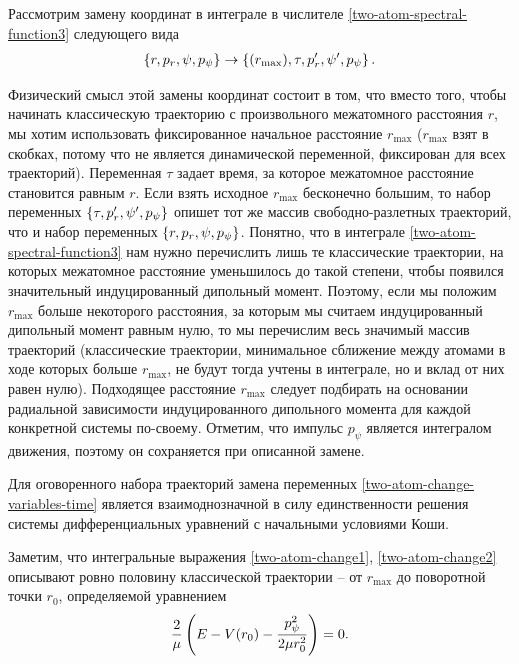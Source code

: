 Рассмотрим замену координат в интеграле в числителе \eqref{two-atom-spectral-function3} следующего вида
\begin{gather}
    \left\{ r, p_r, \psi, p_\psi \right\} \rightarrow \left\{ (r_\text{max}), \tau, p_r^\prime, \psi^\prime, p_\psi \right\} \label{two-atom-change-variables-time}.
\end{gather}

Физический смысл этой замены координат состоит в том, что вместо того, чтобы начинать классическую траекторию с произвольного межатомного расстояния $r$, мы хотим использовать фиксированное начальное расстояние $r_\text{max}$ ($r_\text{max}$ взят в скобках, потому что не является динамической переменной, фиксирован для всех траекторий). Переменная $\tau$ задает время, за которое межатомное расстояние становится равным $r$. Если взять исходное $r_\text{max}$ бесконечно большим, то набор переменных $\left\{ \tau, p_r^\prime, \psi^\prime, p_\psi \right\}$ опишет тот же массив свободно-разлетных траекторий, что и набор переменных $\left\{ r, p_r, \psi, p_\psi \right\}$. Понятно, что в интеграле \eqref{two-atom-spectral-function3} нам нужно перечислить лишь те классические траектории, на которых межатомное расстояние уменьшилось до такой степени, чтобы появился значительный индуцированный дипольный момент. Поэтому, если мы положим $r_\text{max}$ больше некоторого расстояния, за которым мы считаем индуцированный дипольный момент равным нулю, то мы перечислим весь значимый массив траекторий (классические траектории, минимальное сближение между атомами в ходе которых больше $r_\text{max}$, не будут тогда учтены в интеграле, но и вклад от них равен нулю). Подходящее расстояние $r_\text{max}$ следует подбирать на основании радиальной зависимости индуцированного дипольного момента для каждой конкретной системы по-своему. Отметим, что импульс $p_\psi$ является интегралом движения, поэтому он сохраняется при описанной замене. \par
Для оговоренного набора траекторий замена переменных \eqref{two-atom-change-variables-time} является взаимоднозначной в силу единственности решения системы дифференциальных уравнений с начальными условиями Коши. \par
Заметим, что интегральные выражения \eqref{two-atom-change1}, \eqref{two-atom-change2} описывают ровно половину классической траектории -- от $r_\text{max}$ до поворотной точки $r_0$, определяемой уравнением
\begin{gather}
    \frac{2}{\mu} \left( E - V(r_0) - \frac{p_\psi^2}{2 \mu r_0^2} \right) = 0.
\end{gather}

